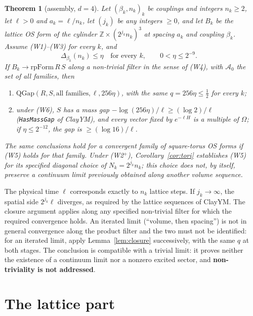 \documentclass[11pt,a4paper]{article}
\theoremstyle{plain}
\newtheorem{theorem}{Theorem}[section]
\theoremstyle{definition}
\theoremstyle{remark}
\numberwithin{equation}{section}
\newcommand{\Z}{\mathbb{Z}}
\newcommand{\cA}{\mathcal{A}}
\begin{document}
\begin{theorem}[assembly, $d=4$]\label{thm:main}
Let $(\beta_k,n_k)_{k}$ be couplings and integers $n_k\ge2$, let $\ell>0$ and $a_k=\ell/n_k$, let $(j_k)$ be any integers $\ge0$, and
let $B_k$ be the lattice OS form of the cylinder $\Z\times(2^{j_k}n_k)^3$ at spacing $a_k$ and coupling $\beta_k$. Assume (W1)--(W3)
for every $k$, and
\begin{equation}\label{eq:unif}
\Delta_{\beta_k}(n_k)\le\eta\quad\text{for every }k,\qquad 0<\eta\le2^{-9}.
\end{equation}
If $B_k\to\mathrm{rpForm}\,R\,S$ along a non-trivial filter in the sense of (W4), with $\cA_0$ the set of all families, then
\begin{enumerate}
\item $\mathrm{QGap}(R,S,\text{all families},\ell,256\eta)$, with the same $q=256\eta\le\frac12$ for every $k$;
\item under (W6), $S$ has a mass gap $-\log(256\eta)/\ell\ge(\log2)/\ell$ (\texttt{HasMassGap} of ClayYM), and every vector fixed by
$e^{-\ell H}$ is a multiple of $\Omega$; if $\eta\le2^{-12}$, the gap is $\ge(\log16)/\ell$.
\end{enumerate}
The same conclusions hold for a convergent family of square-torus OS forms if (W5) holds for that family. Under (W2$^+$),
Corollary~\ref{cor:tori} establishes (W5) for its specified diagonal choice of $N_k=2^{j_k}n_k$; this choice does not, by itself, preserve a
continuum limit previously obtained along another volume sequence.
\end{theorem}

The physical time $\ell$ corresponds exactly to $n_k$ lattice steps. If $j_k\to\infty$, the spatial side $2^{j_k}\ell$ diverges, as
required by the lattice sequences of ClayYM. The closure argument applies along any specified non-trivial filter for which the required
convergence holds. An iterated limit (``volume, then spacing'') is not in general convergence along the product filter and the two must not
be identified: for an iterated limit, apply Lemma~\ref{lem:closure} successively, with the same $q$ at both stages. The conclusion is
compatible with a trivial limit: it proves neither the existence of a continuum limit nor a nonzero excited sector, and
\textbf{non-triviality is not addressed}.

\section{The lattice part}\label{sec:lattice}
\end{document}
